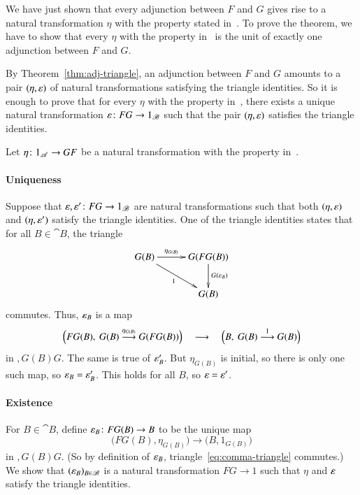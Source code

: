 \begin{pf}
We have just shown that every adjunction between $F$ and $G$ gives rise to
a natural transformation $\eta$ with the property stated
in~.  To prove the theorem, we have to show that
every $\eta$ with the property in~ is the unit of
exactly one adjunction between $F$ and $G$.

By Theorem~\ref{thm:adj-triangle}, an adjunction between $F$ and $G$
amounts to a pair $(\eta, \varepsilon)$ of natural transformations satisfying
the triangle identities.  So it is enough to prove that for every $\eta$
with the property in~, there exists a unique
natural transformation $\epsln\from FG \to 1_\cat{B}$ such that the pair
$(\eta, \varepsilon)$ satisfies the triangle identities.

Let $\eta\from 1_\cat{A} \to GF$ be a natural transformation with the property
in~.

\paragraph*{Uniqueness}
Suppose that $\epsln, \epsln'\from FG \to 1_\cat{B}$ are natural
transformations such that both $(\eta, \varepsilon)$ and $(\eta, \varepsilon')$
satisfy the triangle identities.  One of the triangle identities states
that for all $B \in \cat{B}$, the triangle
%
\begin{equation}
\label{eq:comma-triangle}
\begin{array}{c}
\xymatrix@C+1ex{
G(B) \ar[r]^-{\eta_{G(B)}} \ar[rd]_1    &
G(FG(B)) \ar[d]^{G(\epsln_B)}   \\
        &G(B)
}
\end{array}
\end{equation}
%
commutes.  Thus, $\varepsilon_B$ is a map
\[
\Bigl( FG(B), \ G(B) \stackrel{\eta_{G(B)}}{\longrightarrow} G(FG(B)) \Bigr)
\quad
\longrightarrow
\quad
\Bigl( B, \ G(B) \stackrel{1}{\longrightarrow} G(B) \Bigr)
\]
in $\comma{G(B)}{G}$.  The same is true of $\varepsilon'_B$.  But $\eta_{G(B)}$ is
initial, so there is only one such map, so $\varepsilon_B = \varepsilon'_B$.  This holds
for all $B$, so $\varepsilon = \varepsilon'$.

\paragraph*{Existence}
For $B \in \cat{B}$, define $\epsln_B\from FG(B) \to B$ to be the unique map
\[
\bigl(FG(B), \eta_{G(B)}\bigr)
\to
\bigl(B, 1_{G(B)}\bigr)
\]
in $\comma{G(B)}{G}$.  (So by definition of $\varepsilon_B$,
triangle~\eqref{eq:comma-triangle} commutes.)  We show that $(\varepsilon_B)_{B
  \in \mathscr{B}}$ is a natural transformation $FG \to 1$ such that $\eta$ and
$\varepsilon$ satisfy the triangle identities.


\end{pf}
